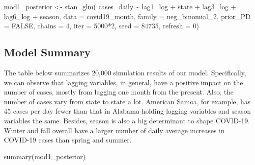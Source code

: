 \documentclass[
]{book}
\newenvironment{Shaded}{\begin{snugshade}}{\end{snugshade}}
\newcommand{\AttributeTok}[1]{\textcolor[rgb]{0.77,0.63,0.00}{#1}}
\newcommand{\ConstantTok}[1]{\textcolor[rgb]{0.00,0.00,0.00}{#1}}
\newcommand{\DecValTok}[1]{\textcolor[rgb]{0.00,0.00,0.81}{#1}}
\newcommand{\FunctionTok}[1]{\textcolor[rgb]{0.00,0.00,0.00}{#1}}
\newcommand{\NormalTok}[1]{#1}
\newcommand{\OtherTok}[1]{\textcolor[rgb]{0.56,0.35,0.01}{#1}}
\newcommand{\SpecialCharTok}[1]{\textcolor[rgb]{0.00,0.00,0.00}{#1}}
\begin{document}
\begin{Shaded}
\begin{Highlighting}[]
\NormalTok{mod1\_posterior }\OtherTok{\textless{}{-}} \FunctionTok{stan\_glm}\NormalTok{(}
\NormalTok{  cases\_daily }\SpecialCharTok{\textasciitilde{}}\NormalTok{ lag1\_log }\SpecialCharTok{+}\NormalTok{ state }\SpecialCharTok{+}\NormalTok{ lag3\_log }\SpecialCharTok{+}\NormalTok{ lag6\_log }\SpecialCharTok{+}\NormalTok{ season, }\AttributeTok{data =}\NormalTok{ covid19\_month,}
  \AttributeTok{family =}\NormalTok{ neg\_binomial\_2,}
  \AttributeTok{prior\_PD =} \ConstantTok{FALSE}\NormalTok{,}
  \AttributeTok{chains =} \DecValTok{4}\NormalTok{, }\AttributeTok{iter =} \DecValTok{5000}\SpecialCharTok{*}\DecValTok{2}\NormalTok{, }\AttributeTok{seed =} \DecValTok{84735}\NormalTok{, }\AttributeTok{refresh =} \DecValTok{0}\NormalTok{)}
\end{Highlighting}
\end{Shaded}

\hypertarget{model-summary}{%
\subsection{Model Summary}\label{model-summary}}

The table below summarizes 20,000 simulation results of our model. Specifically, we can observe that lagging variables, in general, have a positive impact on the number of cases, mostly from lagging one month from the present. Also, the number of cases vary from state to state a lot. American Samoa, for example, has 45 cases per day fewer than that in Alabama holding lagging variables and season variables the same. Besides, season is also a big determinant to shape COVID-19. Winter and fall overall have a larger number of daily average increases in COVID-19 cases than spring and summer.

\begin{Shaded}
\begin{Highlighting}[]
\FunctionTok{summary}\NormalTok{(mod1\_posterior)}
\end{Highlighting}
\end{Shaded}
\end{document}
